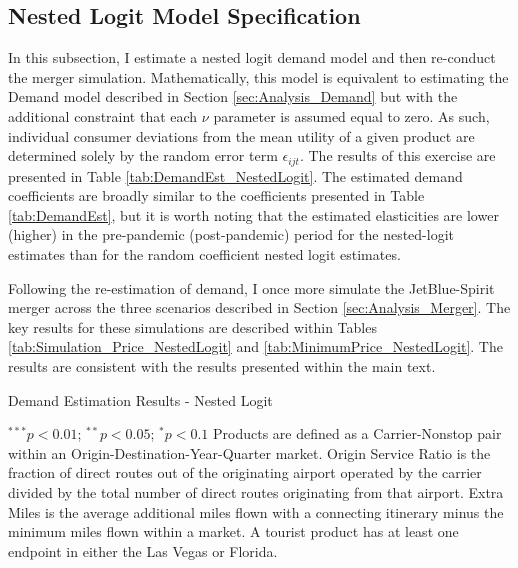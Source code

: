 \documentclass{article}
\begin{document}
\begin{appendices}
    \subsection{Nested Logit Model Specification}
    In this subsection, I estimate a nested logit demand model and then re-conduct the merger simulation. Mathematically, this model is equivalent to estimating the Demand model described in Section \ref{sec:Analysis_Demand} but with the additional constraint that each $\nu$ parameter is assumed equal to zero. As such, individual consumer deviations from the mean utility of a given product are determined solely by the random error term $\epsilon_{ijt}$. The results of this exercise are presented in Table \ref{tab:DemandEst_NestedLogit}. The estimated demand coefficients are broadly similar to the coefficients presented in Table \ref{tab:DemandEst}, but it is worth noting that the estimated elasticities are lower (higher)  in the pre-pandemic (post-pandemic) period for the nested-logit estimates than for the random coefficient nested logit estimates. 

    Following the re-estimation of demand, I once more simulate the JetBlue-Spirit merger across the three scenarios described in Section \ref{sec:Analysis_Merger}. The key results for these simulations are described within Tables \ref{tab:Simulation_Price_NestedLogit} and \ref{tab:MinimumPrice_NestedLogit}. The results are consistent with the results presented within the main text.  

    \begin{table}
        \caption{Demand Estimation Results - Nested Logit}
        \label{tab:DemandEst_NestedLogit}
        \vspace{-15mm}
        \begin{center}
           
        \end{center}
        \vspace{-5mm}
                \footnotesize{$^{***}p<0.01$; $^{**}p<0.05$; $^{*}p<0.1$ Products are defined as a Carrier-Nonstop pair within an Origin-Destination-Year-Quarter market. Origin Service Ratio is the fraction of direct routes out of the originating airport operated by the carrier divided by the total number of direct routes originating from that airport. Extra Miles is the average additional miles flown with a connecting itinerary minus the minimum miles flown within a market.  A tourist product has at least one endpoint in either the Las Vegas or Florida.}
    \end{table}


\end{appendices}
\end{document}
